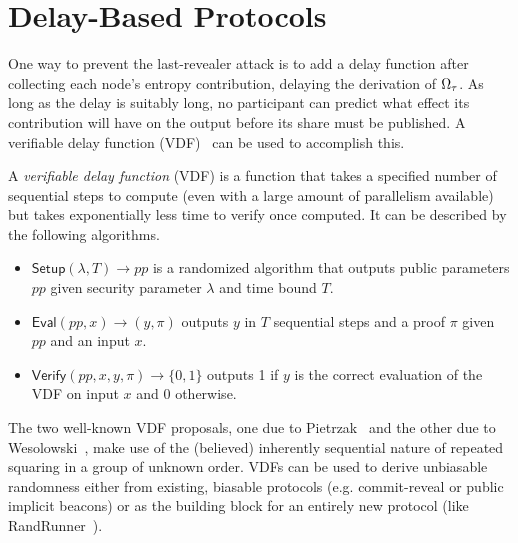 
\section{Delay-Based Protocols}
\label{section:delay}
One way to prevent the last-revealer attack is to add a delay function after collecting each node's entropy contribution, delaying the derivation of $\Omega_\tau$. As long as the delay is suitably long, no participant can predict what effect its contribution will have on the output before its share must be published. A verifiable delay function (VDF)~\cite{boneh2018verifiable,boneh2018survey} can be used to accomplish this.

\begin{definition}
A \textit{verifiable delay function} (VDF) is a function that takes a specified number of sequential steps to compute (even with a large amount of parallelism available) but takes exponentially less time to verify once computed. It can be described by the following algorithms.
\begin{itemize}
\item $\mathsf{Setup}(\lambda, T) \rightarrow pp$ is a randomized algorithm that outputs public parameters $pp$ given security parameter $\lambda$ and time bound $T$.
\item $\mathsf{Eval}(pp, x) \rightarrow (y, \pi)$ outputs $y$ in $T$ sequential steps and a proof $\pi$ given $pp$ and an input $x$.
\item $\mathsf{Verify}(pp, x, y, \pi) \rightarrow \{0, 1\}$ outputs 1 if $y$ is the correct evaluation of the VDF on input $x$ and 0 otherwise.
\end{itemize}
\end{definition}

The two well-known VDF proposals, one due to Pietrzak~\cite{pietrzak2018simple} and the other due to Wesolowski~\cite{wesolowski2019efficient}, make use of the (believed) inherently sequential nature of repeated squaring in a group of unknown order.
VDFs can be used to derive unbiasable randomness either from existing, biasable protocols (e.g. commit-reveal or public implicit beacons) or as the building block for an entirely new protocol (like RandRunner~\cite{schindler2021randrunner}).

